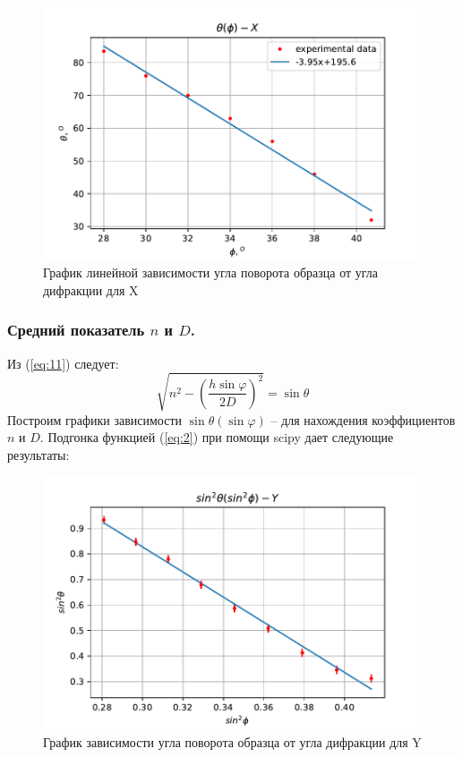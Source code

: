 \documentclass[a4paper, 12pt]{article}
\renewcommand{\phi}{\varphi} %
\begin{document}
\begin{figure}[H]
	\centering
	\includegraphics[scale=0.8]{X_red_1}
	\caption{График линейной зависимости угла поворота образца от угла дифракции для X}
	\label{im:7}
\end{figure}



\subsubsection{Средний показатель $n$ и $D$.}

Из (\ref{eq:11}) следует:
\begin{equation}
\sqrt{n^2-\left(\frac{h\sin\phi}{2D}\right)^2} =\sin\theta
\label{eq:2}
\end{equation}
Построим графики зависимости $\sin\theta(\sin\phi)$ -- для нахождения коэффициентов $n$ и $D$. Подгонка функцией (\ref{eq:2}) при помощи scipy дает следующие результаты:
\begin{figure}[H]
	\centering
	\includegraphics[scale=0.8]{Y_green_1_sin}
	\caption{График зависимости угла поворота образца от угла дифракции для Y}
	\label{im:10}
\end{figure}
 
\end{document}
